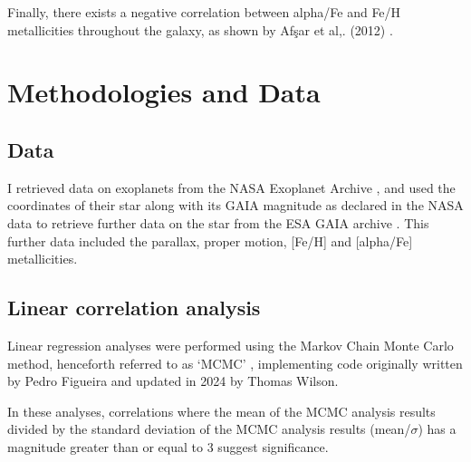 \documentclass[a4paper,twocolumn,12pt]{article}
\begin{document}
Finally, there exists a negative correlation between alpha/Fe and Fe/H metallicities throughout the galaxy, as shown by Afşar et al,. (2012) \cite{Afşar}.




\section{Methodologies and Data}
\subsection{Data}


I retrieved data on exoplanets from the NASA Exoplanet Archive \cite{NASA Exoplanet Archive}, and used the coordinates of their star along with its GAIA magnitude as declared in the NASA data to retrieve further data on the star from the ESA GAIA archive \cite{GAIA Archive}. This further data included the parallax, proper motion, [Fe/H] and [alpha/Fe] metallicities.

\subsection{Linear correlation analysis}
\label{subsection: MCMC}
Linear regression analyses were performed using the Markov Chain Monte Carlo method, henceforth referred to as `MCMC' \cite{MCMC}, implementing code originally written by Pedro Figueira and updated in 2024 by Thomas Wilson.


In these analyses, correlations where the mean of the MCMC analysis results divided by the standard deviation of the MCMC analysis results (mean/$\sigma$) has a magnitude greater than or equal to 3 suggest significance.
\end{document}
